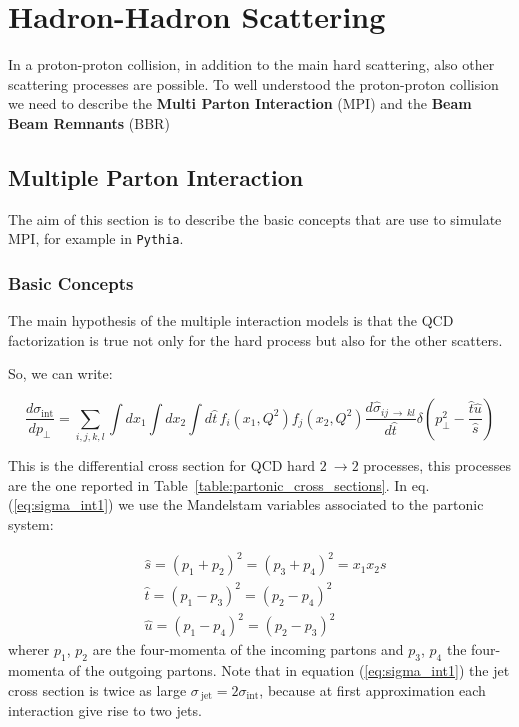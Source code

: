 \documentclass[10pt]{article}
\begin{document}
\section{Hadron-Hadron Scattering}

In a proton-proton collision, in addition to the main hard scattering, also other scattering processes are possible. To well understood the proton-proton collision we need to describe the \textbf{Multi Parton Interaction} (MPI) and the \textbf{Beam Beam Remnants} (BBR) 

\subsection{Multiple Parton Interaction}

The aim of this section is to describe the basic concepts that are use to simulate MPI, for example in  \texttt{Pythia}.

\subsubsection{Basic Concepts}

The main hypothesis of the multiple interaction models is that the QCD factorization is true not only for the hard process but also for the other scatters.

So, we can write:

\begin{equation}
	\frac{d\sigma_{\text{int}}}{dp_\perp}=\displaystyle\sum_{i,j,k,l}\displaystyle\int dx_1 \displaystyle\int dx_2 \displaystyle\int d\hat{t}\, f_i(x_1,Q^2)f_j(x_2,Q^2)\frac{d\hat{\sigma}_{ij\,\rightarrow\,kl}}{d\hat{t}}\delta\left( p_\perp^2-\frac{\hat{t}\hat{u}}{\hat{s}} \right)
	\label{eq:sigma_int1}
\end{equation}


This is the differential cross section for QCD hard $2\ \rightarrow 2$ processes, this processes are the one reported in \mbox{Table \ref{table:partonic_cross_sections}}. In eq. (\ref{eq:sigma_int1}) we use the Mandelstam variables associated to the partonic system:

\begin{align}
	&\hat{s}=(p_1+p_2)^2=(p_3+p_4)^2=x_1x_2s\\
	&\hat{t}=(p_1-p_3)^2=(p_2-p_4)^2\\
	&\hat{u}=(p_1-p_4)^2=(p_2-p_3)^2
\end{align} 
wherer $p_1$, $p_2$ are the four-momenta of the incoming partons and $p_3$, $p_4$ the four-momenta of the outgoing partons. 
Note that in equation (\ref{eq:sigma_int1}) the jet cross section is twice as large $\sigma_{\ \text{jet}}=2\sigma_{\text{int}}$, because at first approximation each interaction give rise to two jets.
\end{document}
